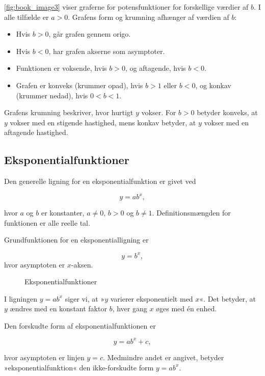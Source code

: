 \autoref{fig:book_image3} viser graferne for potensfunktioner for forskellige værdier af \(b\). I alle tilfælde er \(a > 0\). Grafens form og krumning afhænger af værdien af \(b\):
\begin{itemize}
    \item Hvis \(b > 0\), går grafen gennem origo.
    \item Hvis \(b < 0\), har grafen akserne som asymptoter.
    \item Funktionen er voksende, hvis \(b > 0\), og aftagende, hvis \(b < 0\).
    \item Grafen er konveks (krummer opad), hvis \(b > 1\) eller \(b < 0\), og konkav (krummer nedad), hvis \(0 < b < 1\).
\end{itemize}
Grafens krumning beskriver, hvor hurtigt \(y\) vokser. For \(b > 0\) betyder konveks, at \(y\) vokser med en stigende hastighed, mens konkav betyder, at \(y\) vokser med en aftagende hastighed.

\subsection*{Eksponentialfunktioner}

Den generelle ligning for en eksponentialfunktion er givet ved

\[
y = a b^x,
\]

hvor \(a\) og \(b\) er konstanter, \(a \neq 0\), \(b > 0\) og \(b \neq 1\). Definitionsmængden for funktionen er alle reelle tal.

Grundfunktionen for en eksponentialligning er

\[
y = b^x,
\]
hvor asymptoten er \(x\)-aksen.

\begin{figure}[htbp]
    \centering
    \resizebox{\textwidth}{!}{\DaExponentialPanels}
    \caption{Eksponentialfunktioner}
    \label{fig:book_image4}
\end{figure}

I ligningen \(y = a b^x\) siger vi, at »\(y\) varierer eksponentielt med \(x\)«. Det betyder, at \(y\) ændres med en konstant faktor \(b\), hver gang \(x\) øges med én enhed.

Den forskudte form af eksponentialfunktionen er

\[
y = a b^x + c,
\]

hvor asymptoten er linjen \(y = c\). Medmindre andet er angivet, betyder »eksponentialfunktion« den ikke-forskudte form \(y = a b^x\).

